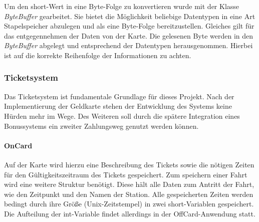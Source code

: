 \documentclass[	a4paper,
			11pt,
			oneside,
			parskip]{scrartcl}
\begin{document}
Um den short-Wert in eine Byte-Folge zu konvertieren wurde mit der Klasse \textit{ByteBuffer} gearbeitet. Sie bietet die Möglichkeit beliebige Datentypen in eine Art Stapelspeicher abzulegen und als eine Byte-Folge bereitzustellen. Gleiches gilt für das entgegennehmen der Daten von der Karte. Die gelesenen Byte werden in den \textit{ByteBuffer} abgelegt und entsprechend der Datentypen herausgenommen. Hierbei ist auf die korrekte Reihenfolge der Informationen zu achten.

\subsubsection{Ticketsystem}

Das Ticketsystem ist fundamentale Grundlage für dieses Projekt. Nach der Implementierung der Geldkarte stehen der Entwicklung des Systems keine Hürden mehr im Wege. Des Weiteren soll durch die spätere Integration eines Bonussystems ein zweiter Zahlungsweg genutzt werden können. 

\paragraph{OnCard} Auf der Karte wird hierzu eine Beschreibung des Tickets sowie die nötigen Zeiten für den Gültigkeitszeitraum des Tickets gespeichert. Zum speichern einer Fahrt wird eine weitere Struktur benötigt. Diese hält alle Daten zum Antritt der Fahrt, wie den Zeitpunkt und den Namen der Station. Alle gespeicherten Zeiten werden bedingt durch ihre Größe (Unix-Zeitstempel) in zwei short-Variablen gespeichert. Die Aufteilung der int-Variable findet allerdings in der OffCard-Anwendung statt.
\end{document}
